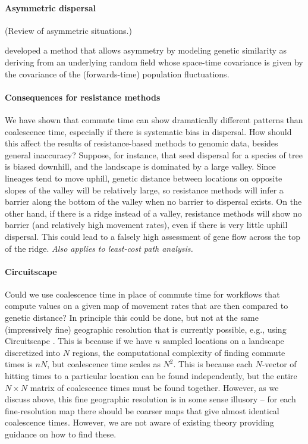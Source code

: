 \documentclass{article}
\newcommand{\plr}[1]{{\em \color{blue} #1}}
\begin{document}
\paragraph{Asymmetric dispersal}
(Review of asymmetric situations.)

\citet{hanks2017modeling} developed a method that allows asymmetry
by modeling genetic similarity as deriving from an underlying random field
whose space-time covariance is given by the covariance of the (forwards-time) population fluctuations.


\paragraph{Consequences for resistance methods}
We have shown that commute time can show dramatically different patterns
than coalescence time, especially if there is systematic bias in dispersal.
How should this affect the results of resistance-based methods to genomic data,
besides general inaccuracy?
Suppose, for instance, that seed dispersal for a species of tree
is biased downhill,
and the landscape is dominated by a large valley.
Since lineages tend to move uphill,
genetic distance between locations on opposite slopes of the valley will be relatively large,
so resistance methods will infer a barrier along the bottom of the valley
when no barrier to dispersal exists.
On the other hand, if there is a ridge instead of a valley,
resistance methods will show no barrier (and relatively high movement rates),
even if there is very little uphill dispersal.
This could lead to a falsely high assessment of gene flow across the top of the ridge.
\plr{Also applies to least-cost path analysis.}

\paragraph{Circuitscape}
Could we use coalescence time in place of commute time
for workflows that compute values on a given map of movement rates
that are then compared to genetic distance?
In principle this could be done,
but not at the same (impressively fine) geographic resolution that is currently possible,
e.g., using Circuitscape \citep{circuitscape}.
This is because if we have $n$ sampled locations
on a landscape discretized into $N$ regions,
the computational complexity of finding commute times is $nN$,
but coalescence time scales as $N^2$.
This is because each $N$-vector of hitting times to a particular location can be found independently,
but the entire $N \times N$ matrix of coalescence times must be found together.
However, as we discuss above, this fine geographic resolution is in some sense illusory --
for each fine-resolution map there should be coarser maps that give almost identical coalescence times.
However, we are not aware of existing theory providing guidance on how to find these.
\end{document}
